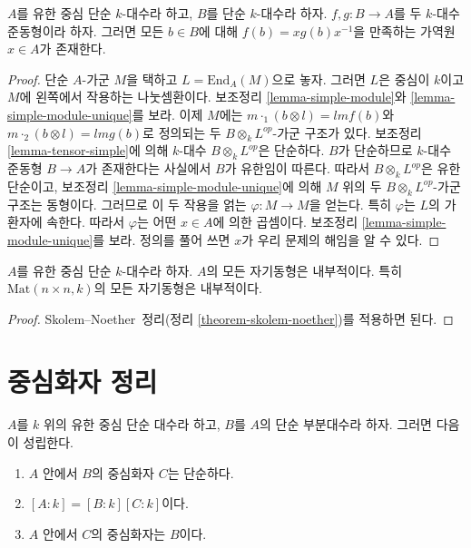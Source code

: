 \begin{theorem}
\label{theorem-skolem-noether}
$A$를 유한 중심 단순 $k$-대수라 하고, $B$를 단순 $k$-대수라 하자.
$f, g : B \to A$를 두 $k$-대수 준동형이라 하자. 그러면 모든
$b \in B$에 대해 $f(b) = xg(b)x^{-1}$을 만족하는 가역원
$x \in A$가 존재한다.
\end{theorem}

\begin{proof}
단순 $A$-가군 $M$을 택하고 $L = \text{End}_A(M)$으로 놓자.
그러면 $L$은 중심이 $k$이고 $M$에 왼쪽에서 작용하는 나눗셈환이다.
보조정리 \ref{lemma-simple-module}와 \ref{lemma-simple-module-unique}를 보라.
이제 $M$에는
$m \cdot_1 (b \otimes l) = lmf(b)$와 $m \cdot_2 (b \otimes l) = lmg(b)$로
정의되는 두 $B \otimes_k L^{op}$-가군 구조가 있다.
보조정리 \ref{lemma-tensor-simple}에 의해 $k$-대수
$B \otimes_k L^{op}$은 단순하다. $B$가 단순하므로 $k$-대수 준동형
$B \to A$가 존재한다는 사실에서 $B$가 유한임이 따른다. 따라서
$B \otimes_k L^{op}$은 유한 단순이고, 보조정리
\ref{lemma-simple-module-unique}에 의해 $M$ 위의 두
$B \otimes_k L^{op}$-가군 구조는 동형이다. 그러므로 이 두 작용을
얽는 $\varphi : M \to M$을 얻는다. 특히 $\varphi$는 $L$의 가환자에
속한다. 따라서 $\varphi$는 어떤 $x \in A$에 의한 곱셈이다. 보조정리
\ref{lemma-simple-module-unique}를 보라. 정의를 풀어 쓰면 $x$가
우리 문제의 해임을 알 수 있다.
\end{proof}

\begin{lemma}
\label{lemma-automorphism-inner}
$A$를 유한 중심 단순 $k$-대수라 하자. $A$의 모든 자기동형은 내부적이다.
특히 $\text{Mat}(n \times n, k)$의 모든 자기동형은 내부적이다.
\end{lemma}

\begin{proof}
Skolem--Noether~정리(정리 \ref{theorem-skolem-noether})를 적용하면 된다.
\end{proof}



\section{중심화자 정리}
\label{section-centralizer}


\begin{theorem}
\label{theorem-centralizer}
$A$를 $k$ 위의 유한 중심 단순 대수라 하고, $B$를 $A$의 단순
부분대수라 하자. 그러면 다음이 성립한다.
\begin{enumerate}
\item $A$ 안에서 $B$의 중심화자 $C$는 단순하다.
\item $[A : k] = [B : k][C : k]$이다.
\item $A$ 안에서 $C$의 중심화자는 $B$이다.
\end{enumerate}
\end{theorem}

